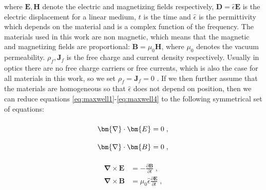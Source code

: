 where $\bm{E}, \bm{H}$ denote the electric and magnetizing fields respectively,  $\bm{D}=\hat{\epsilon} \bm{E}$ is the electric displacement for a linear medium, $t$ is the time and $\hat{\epsilon}$ is the permittivity which depends on the material and is a complex function of the frequency. The materials used in this work are non magnetic, which means that the magnetic and magnetizing fields are proportional: $\bm{B} = \mu_0 \bm{H}$, where $\mu_0$ denotes the vacuum permeability. $\rho_f, \bm{J}_f$ is the free charge and current density respectively. Usually in optics there are no free charge carriers or free currents, which is also the case for all materials in this work, so we set $\rho_f=\bm{J}_f=0$ \cite{Roth2019}. If we then further assume that the materials are homogeneous so that $\hat{\epsilon}$ does not depend on position, then we can reduce equations \ref{eq:maxwell1}-\ref{eq:maxwell4} to the following symmetrical set of equations:

\noindent\begin{minipage}{.5\linewidth}
\begin{align}
    \bm{\nabla}\cdot \bm{E} &=0\;,\label{eq:maxwell1reduced}
    \vphantom{\frac{\partial\bm{B}}{\partial t}}\\
    \bm{\nabla}\cdot\bm{B} &=0\;,\vphantom{\frac{\partial\bm{B}}{\partial t}}\label{eq:maxwell2reduced}
\end{align}
\end{minipage}%
\begin{minipage}{.5\linewidth}
\begin{align}
    \bm{\nabla}\times\bm{E} &=-\frac{\partial\bm{B}}{\partial t}\;,\label{eq:maxwell3reduced}
    \\
    \bm{\nabla}\times\bm{B} &=\mu_0 \hat{\epsilon} \frac{\partial\bm{E}}{\partial t}\;,\label{eq:maxwell4reduced}
\end{align}
\end{minipage}
\newline

